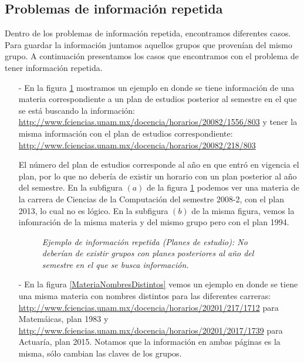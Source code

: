 \subsection{Problemas de información repetida}

Dentro de los problemas de información repetida, encontramos diferentes casos. Para guardar la información juntamos aquellos grupos que provenían del mismo grupo. A continuación presentamos los casos que encontramos con el problema de tener información repetida.

\begin{itemize}
\item[-] En la figura \ref{planRepetido} mostramos un ejemplo en donde se tiene información de una materia correspondiente a un plan de estudios posterior al semestre en el que se está buscando la información: \url{http://www.fciencias.unam.mx/docencia/horarios/20082/1556/803} y tener la misma información con el plan de estudios correspondiente: \url{http://www.fciencias.unam.mx/docencia/horarios/20082/218/803}

El número del plan de estudios corresponde al año en que entró en vigencia el plan, por lo que no debería de existir un horario con un plan posterior al año del semestre. En la subfigura $(a)$ de la figura \ref{planRepetido} podemos ver una materia de la carrera de Ciencias de la Computación del semestre 2008-2, con el plan 2013, lo cual no es lógico. En la subfigura $(b)$ de la misma figura, vemos la infomración de la misma materia y del mismo grupo pero con el plan 1994.

\begin{figure}[H]
	\centering
	\caption[\textit{Ejemplo de información repetida: Planes de estudio}]{\textit{Ejemplo de información repetida (Planes de estudio): No deberían de existir grupos con planes posteriores al año del semestre en el que se busca información.}}\label{planRepetido}
\end{figure}

\item[-] En la figura \ref{MateriaNombresDistintos} vemos un ejemplo en donde se tiene una misma materia con nombres distintos para las diferentes carreras: \url{http://www.fciencias.unam.mx/docencia/horarios/20201/217/1712} para Matemáicas, plan 1983 y \url{http://www.fciencias.unam.mx/docencia/horarios/20201/2017/1739} para Actuaría, plan 2015. Notamos que la información en ambas páginas es la misma, sólo cambian las claves de los grupos.


\end{itemize}
